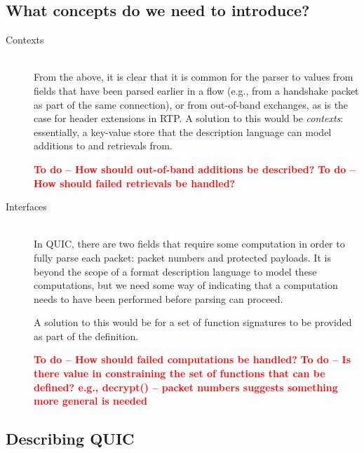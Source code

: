 \documentclass[10pt]{article}
\newcommand{\todo}[1]{\textbf{\textcolor{red}{To do -- #1}}}
\begin{document}
\subsection{What concepts do we need to introduce?}

\begin{description}
	\item[Contexts] \hfill \\
	From the above, it is clear that it is common for the parser to values from fields that
	have been parsed earlier in a flow (e.g., from a handshake packet as part of the same
	connection), or from out-of-band exchanges, as is the case for header extensions in
	RTP. A solution to this would be \emph{contexts}: essentially, a key-value store that
	the description language can model additions to and retrievals from.
	
	\todo{How should out-of-band additions be described?}
	\todo{How should failed retrievals be handled?}
	
	\item[Interfaces] \hfill \\
	In QUIC, there are two fields that require some computation in order to fully parse
	each packet: packet numbers and protected payloads. It is beyond the scope of a
	format description language to model these computations, but we need some way of
	indicating that a computation needs to have been performed before parsing can proceed.
	
	A solution to this would be for a set of function signatures to be provided as part
	of the definition.
	
	\todo{How should failed computations be handled?}
	\todo{Is there value in constraining the set of functions that can be defined? e.g.,
	      decrypt() -- packet numbers suggests something more general is needed}
\end{description}

\subsection{Describing QUIC}
\end{document}
